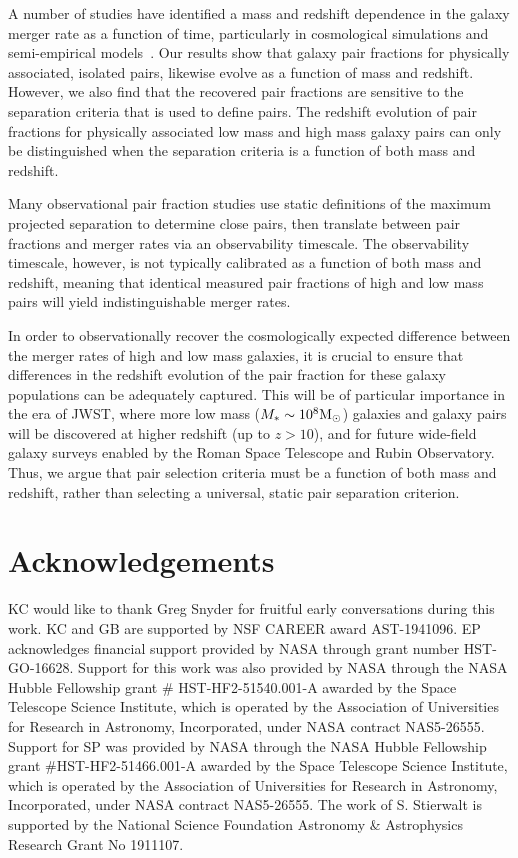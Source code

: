 \documentclass[twocolumn]{aastex631}
\begin{document}
    A number of studies have identified a mass and redshift dependence in the galaxy merger rate as a function of time, particularly in cosmological simulations and semi-empirical models~\cite[see e.g.][]{Stewart2009,Hopkins2010,RG2015}. 
    Our results show that galaxy pair fractions for physically associated, isolated pairs, likewise evolve as a function of mass and redshift. 
    However, we also find that the recovered pair fractions are sensitive to the separation criteria that is used to define pairs.
    The redshift evolution of pair fractions for physically associated low mass and high mass galaxy pairs can only be distinguished when the separation criteria is a function of both mass and redshift.

    Many observational pair fraction studies use static definitions of the maximum projected separation to determine close pairs, then translate between pair fractions and merger rates via an observability timescale. 
    The observability timescale, however, is not typically calibrated as a function of both mass and redshift, meaning that identical measured pair fractions of high and low mass pairs will yield indistinguishable merger rates. 

    In order to observationally recover the cosmologically expected difference between the merger rates of high and low mass galaxies, it is crucial to ensure that differences in the redshift evolution of the pair fraction for these galaxy populations can be adequately captured. 
    This will be of particular importance in the era of JWST, where more low mass ($M_*\sim10^8 \mathrm{M}_\odot$) galaxies and galaxy pairs will be discovered at higher redshift (up to $z>10$), and for future wide-field galaxy surveys enabled by the Roman Space Telescope and Rubin Observatory. 
    Thus, we argue that pair selection criteria must be a function of both mass and redshift, rather than selecting a universal, static pair separation criterion.



\section*{Acknowledgements}
KC would like to thank Greg Snyder for fruitful early conversations during this work. 
KC and GB are supported by NSF CAREER award AST-1941096. 
EP acknowledges financial support provided by NASA through grant number HST-GO-16628. 
Support for this work was also provided by NASA through the NASA Hubble Fellowship grant \# HST-HF2-51540.001-A awarded by the Space Telescope Science Institute, which is operated by the Association of Universities for Research in Astronomy, Incorporated, under NASA contract NAS5-26555.
Support for SP was provided by NASA through the NASA Hubble Fellowship grant \#HST-HF2-51466.001-A awarded by the Space Telescope Science Institute, which is operated by the Association of Universities for Research in Astronomy, Incorporated, under NASA contract NAS5-26555.
The work of S. Stierwalt is supported by the National Science Foundation Astronomy \& Astrophysics Research Grant No 1911107.
\end{document}
